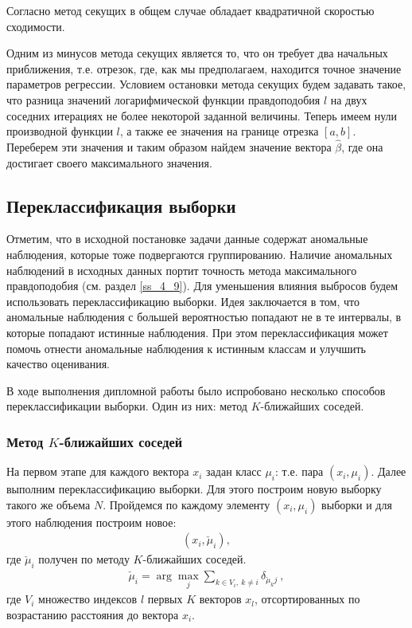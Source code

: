 Согласно \cite{NumericalMethods} метод секущих в общем случае обладает квадратичной скоростью сходимости.

Одним из минусов метода секущих является то, что он требует два начальных приближения, т.е. отрезок, где, как мы предполагаем, находится точное значение параметров регрессии.
Условием остановки метода секущих будем задавать такое, что разница значений логарифмической функции правдоподобия $l$ на двух соседних итерациях не более некоторой заданной величины.
Теперь имеем нули производной функции $l$, а также ее значения на границе отрезка $[a,b]$.
Переберем эти значения и таким образом найдем значение вектора $\hat{\beta}$, где она достигает своего максимального значения.

\subsection{Переклассификация выборки}
Отметим, что в исходной постановке задачи данные содержат аномальные наблюдения, которые тоже подвергаются группированию. 
Наличие аномальных наблюдений в исходных данных портит точность метода максимального правдоподобия (см. раздел \ref{ss_4_9}).
Для уменьшения влияния выбросов будем использовать переклассификацию выборки.
Идея заключается в том, что аномальные наблюдения с большей вероятностью попадают не в те интервалы, в которые попадают истинные наблюдения. 
При этом переклассификация может помочь отнести аномальные наблюдения к истинным классам и улучшить качество оценивания.


В ходе выполнения дипломной работы было испробовано несколько способов переклассификации выборки. Один из них: метод $K$-ближайших соседей. 

\subsubsection{Метод $K$-ближайших соседей}
На первом этапе для каждого вектора $x_i$ задан класс $\mu_i$: т.е. пара $(x_i,\mu_i)$.
Далее выполним переклассификацию выборки. 
Для этого построим новую выборку такого же объема $N$.
Пройдемся по каждому элементу $(x_i, \mu_i)$ выборки и для этого наблюдения построим новое:
\begin{eqnarray}
    (x_i, \check{\mu}_i),
\end{eqnarray}
где $\check{\mu}_i$ получен по методу $K$-ближайших соседей\cite{NEAREST_NEIGHBOR}.\hfill\break
\begin{eqnarray}
    \check{\mu}_i = \arg\max_j \sum_{k \in V_i,~k\neq i} \delta_{\check{\mu}_k j}~,
\end{eqnarray}
где $V_i$ множество индексов $l$ первых $K$ векторов $x_l$, отсортированных по возрастанию расстояния до вектора $x_i$.

